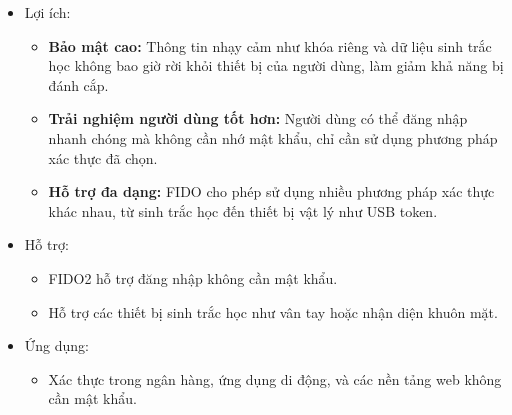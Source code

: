 \begin{itemize}
\begin{itemize}
    \end{itemize}
    \item Lợi ích:
    \begin{itemize}
        \item \textbf{Bảo mật cao:} Thông tin nhạy cảm như khóa riêng và dữ liệu sinh trắc học không bao giờ rời khỏi thiết bị của người dùng, làm giảm khả năng bị đánh cắp.
        \item \textbf{Trải nghiệm người dùng tốt hơn: }Người dùng có thể đăng nhập nhanh chóng mà không cần nhớ mật khẩu, chỉ cần sử dụng phương pháp xác thực đã chọn.
        \item \textbf{Hỗ trợ đa dạng:} FIDO cho phép sử dụng nhiều phương pháp xác thực khác nhau, từ sinh trắc học đến thiết bị vật lý như USB token.
    \end{itemize}
    \item Hỗ trợ:
    \begin{itemize}
        \item FIDO2 hỗ trợ đăng nhập không cần mật khẩu.
        \item Hỗ trợ các thiết bị sinh trắc học như vân tay hoặc nhận diện khuôn mặt.
    \end{itemize}
    \item Ứng dụng:
    \begin{itemize}
        \item Xác thực trong ngân hàng, ứng dụng di động, và các nền tảng web không cần mật khẩu.
    \end{itemize}
\end{itemize}

